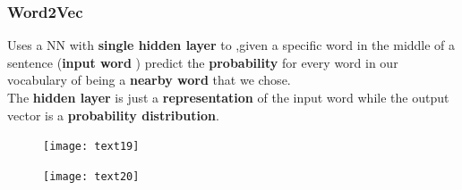 \subsubsection{Word2Vec}
Uses a NN with \textbf{single hidden layer} to ,given a specific word in the middle of a sentence (\textbf{input word} ) predict the \textbf{probability} for every word in our vocabulary of being a \textbf{nearby word} that we chose.\\
The \textbf{hidden layer} is just a \textbf{representation}  of the input word while the output vector is a \textbf{probability distribution}.
 \begin{figure}[H]
  \centering
  \texttt{[image: text19]}
\end{figure}
 \begin{figure}[H]
  \centering
  \texttt{[image: text20]}
\end{figure}